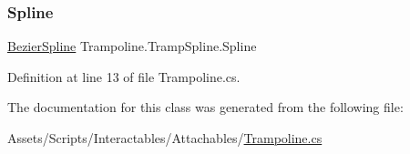 \mbox{\label{class_trampoline_1_1_tramp_spline_a579fc3045ac43b0cc882a6d4f0341cd0}} 
\subsubsection{\texorpdfstring{Spline}{Spline}}
{\footnotesize\ttfamily \mbox{\hyperlink{class_bezier_spline}{Bezier\+Spline}} Trampoline.\+Tramp\+Spline.\+Spline}



Definition at line 13 of file Trampoline.\+cs.



The documentation for this class was generated from the following file\+:\begin{DoxyCompactItemize}
\item 
Assets/\+Scripts/\+Interactables/\+Attachables/\mbox{\hyperlink{_trampoline_8cs}{Trampoline.\+cs}}\end{DoxyCompactItemize}
